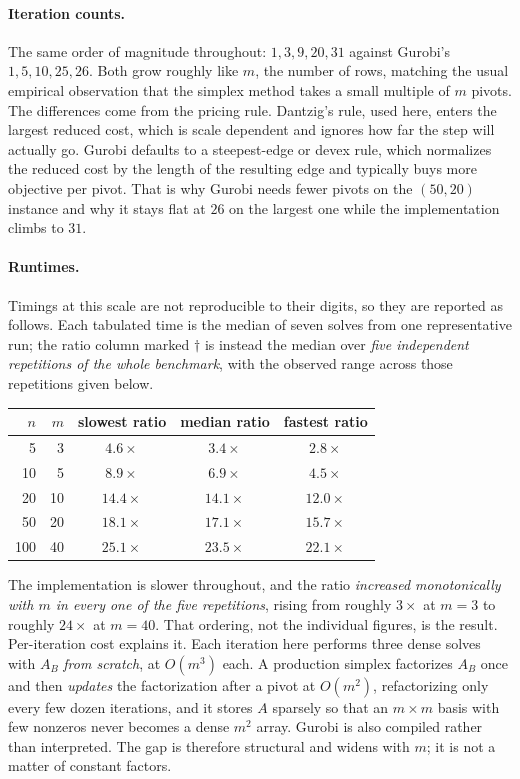 \documentclass[11pt]{article}
\theoremstyle{definition}
\theoremstyle{plain}
\begin{document}
\paragraph{Iteration counts.} The same order of magnitude throughout:
$1, 3, 9, 20, 31$ against Gurobi's $1, 5, 10, 25, 26$. Both grow roughly
like $m$, the number of rows, matching the usual empirical observation
that the simplex method takes a small multiple of $m$ pivots. The
differences come from the pricing rule. Dantzig's rule, used here,
enters the largest reduced cost, which is scale dependent and ignores
how far the step will actually go. Gurobi defaults to a steepest-edge or
devex rule, which normalizes the reduced cost by the length of the
resulting edge and typically buys more objective per pivot. That is why
Gurobi needs fewer pivots on the $(50,20)$ instance and why it stays
flat at $26$ on the largest one while the implementation climbs to $31$.

\paragraph{Runtimes.} Timings at this scale are not reproducible to
their digits, so they are reported as follows. Each tabulated time is
the median of seven solves from one representative run; the ratio column
marked $\dagger$ is instead the median over \emph{five independent
repetitions of the whole benchmark}, with the observed range across
those repetitions given below.

\begin{center}
\begin{tabular}{@{}rrccc@{}}
\toprule
$n$ & $m$ & slowest ratio & median ratio & fastest ratio \\
\midrule
  5 &  3 & $4.6\times$  & $3.4\times$  & $2.8\times$ \\
 10 &  5 & $8.9\times$  & $6.9\times$  & $4.5\times$ \\
 20 & 10 & $14.4\times$ & $14.1\times$ & $12.0\times$ \\
 50 & 20 & $18.1\times$ & $17.1\times$ & $15.7\times$ \\
100 & 40 & $25.1\times$ & $23.5\times$ & $22.1\times$ \\
\bottomrule
\end{tabular}
\end{center}

The implementation is slower throughout, and the ratio \emph{increased
monotonically with $m$ in every one of the five repetitions}, rising
from roughly $3\times$ at $m = 3$ to roughly $24\times$ at $m = 40$.
That ordering, not the individual figures, is the result.
Per-iteration
cost explains it. Each iteration here performs three dense solves with
$A_B$ \emph{from scratch}, at $O(m^3)$ each. A production simplex
factorizes $A_B$ once and then \emph{updates} the factorization after a
pivot at $O(m^2)$, refactorizing only every few dozen iterations, and it
stores $A$ sparsely so that an $m \times m$ basis with few nonzeros
never becomes a dense $m^2$ array. Gurobi is also compiled rather than
interpreted. The gap is therefore structural and widens with $m$; it is
not a matter of constant factors.
\end{document}
